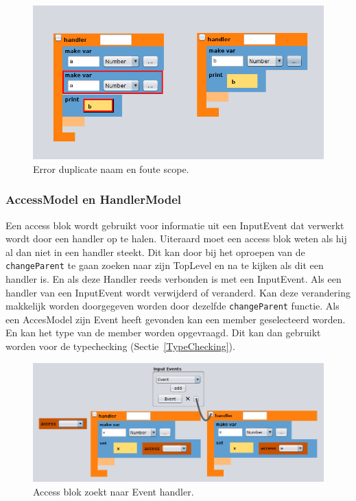 \documentclass[]{article}
\begin{document}
\begin{figure}[H]
  \centering
\includegraphics[scale=0.4]{AnalyseADTAlgorithm/blockmodel/errorvars}
  \caption{Error duplicate naam en foute scope.} \label{errorvars}
\end{figure}

\subsubsection{AccessModel en HandlerModel}
\label{access&Handler}
Een access blok wordt gebruikt voor informatie uit een InputEvent dat verwerkt wordt door een handler op te halen. Uiteraard moet een access blok weten als hij al dan niet in een handler steekt. Dit kan door bij het oproepen van de \texttt{changeParent} te gaan zoeken naar zijn TopLevel en na te kijken als dit een handler is. En als deze Handler reeds verbonden is met een InputEvent. Als een handler van een InputEvent wordt verwijderd of veranderd. Kan deze verandering makkelijk worden doorgegeven worden door dezelfde \texttt{changeParent} functie. Als een AccesModel zijn Event heeft gevonden kan een member geselecteerd worden. En kan het type van de member worden opgevraagd. Dit kan dan gebruikt worden voor de typechecking (Sectie~\ref{TypeChecking}).
\begin{figure}[H]
  \centering
\includegraphics[scale=0.4]{AnalyseADTAlgorithm/blockmodel/accesHandler}
  \caption{Access blok zoekt naar Event handler.} \label{findhandler}
\end{figure}
\end{document}
